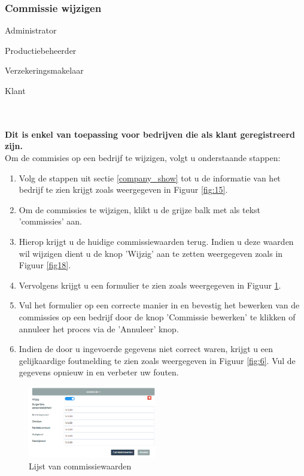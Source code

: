 \documentclass[11pt,openany]{article}
\newcommand{\cmark}{\ding{51}}%
\newcommand{\xmark}{\ding{55}}%
\newcommand{\done}{\rlap{$\square$}{\raisebox{2pt}{\large\hspace{1pt}\cmark}}%
	\hspace{-2.5pt}}
\newcommand{\wontfix}{\rlap{$\square$}{\large\hspace{1pt}\xmark}}
\begin{document}
\subsubsection{Commissie wijzigen}
\label{company_commision}
\begin{todolist}
	\item[\done] Administrator
	\item[\done] Productiebeheerder
	\item[\done] Verzekeringsmakelaar
	\item[\wontfix] Klant 
\end{todolist}
\\
\\
\textbf{Dit is enkel van toepassing voor bedrijven die als klant geregistreerd zijn.}
\\
Om de commisies op een bedrijf te wijzigen, volgt u onderstaande stappen:
\begin{enumerate}
		\item Volg de stappen uit sectie \ref{company_show} tot u de informatie van het bedrijf te zien krijgt zoals weergegeven in Figuur \ref{fig:15}.
	\item Om de commissies te wijzigen, klikt u de grijze balk met als tekst 'commissies' aan.
	\item Hierop krijgt u de huidige commissiewaarden terug. Indien u deze waarden wil wijzigen dient u
	de knop 'Wijzig' aan te zetten weergegeven zoals in Figuur \ref{fig18}.
	\item Vervolgens krijgt u een formulier te zien zoals weergegeven in Figuur \ref{fig:18}.
	\item Vul het formulier op een correcte manier in en bevestig het bewerken van de commissies op een bedrijf door de knop 'Commissie bewerken' te klikken of annuleer het proces via de 'Annuleer' knop.
	\item Indien de door u ingevoerde gegevens niet correct waren, krijgt u een gelijkaardige foutmelding te zien zoals weergegeven in Figuur \ref{fig:6}. Vul de gegevens opnieuw in en verbeter uw fouten.
\end{enumerate}


\begin{figure}
	\centering
	\includegraphics[width=0.5\textwidth]{img/fig47.png}
	\caption{Lijst van commissiewaarden} 
	\label{fig:18} 
\end{figure}
\end{document}
